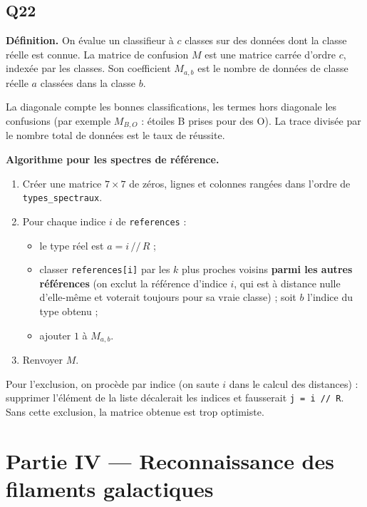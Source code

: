\documentclass[11pt,a4paper]{article}
\providecommand{\tightlist}{\setlength{\itemsep}{0pt}\setlength{\parskip}{0pt}}
\begin{document}
\hypertarget{q22}{%
\subsection{Q22}\label{q22}}

\textbf{Définition.} On évalue un classifieur à \(c\) classes sur des données dont la classe réelle est connue. La matrice de confusion \(M\) est une matrice carrée d'ordre \(c\), indexée par les classes. Son coefficient \(M_{a,b}\) est le nombre de données de classe réelle \(a\) classées dans la classe \(b\).

La diagonale compte les bonnes classifications, les termes hors diagonale les confusions (par exemple \(M_{B,O}\) : étoiles B prises pour des O). La trace divisée par le nombre total de données est le taux de réussite.

\textbf{Algorithme pour les spectres de référence.}

\begin{enumerate}
\def\labelenumi{\arabic{enumi}.}
\tightlist
\item
  Créer une matrice \(7 \times 7\) de zéros, lignes et colonnes rangées dans l'ordre de \texttt{types\_spectraux}.
\item
  Pour chaque indice \(i\) de \texttt{references} :

  \begin{itemize}
  \tightlist
  \item
    le type réel est \(a = i \,/\!/\, R\) ;
  \item
    classer \texttt{references{[}i{]}} par les \(k\) plus proches voisins \textbf{parmi les autres références} (on exclut la référence d'indice \(i\), qui est à distance nulle d'elle-même et voterait toujours pour sa vraie classe) ; soit \(b\) l'indice du type obtenu ;
  \item
    ajouter \(1\) à \(M_{a,b}\).
  \end{itemize}
\item
  Renvoyer \(M\).
\end{enumerate}

Pour l'exclusion, on procède par indice (on saute \(i\) dans le calcul des distances) : supprimer l'élément de la liste décalerait les indices et fausserait \texttt{j\ =\ i\ //\ R}. Sans cette exclusion, la matrice obtenue est trop optimiste.

\hypertarget{partie-iv-reconnaissance-des-filaments-galactiques}{%
\section{Partie IV --- Reconnaissance des filaments galactiques}\label{partie-iv-reconnaissance-des-filaments-galactiques}}
\end{document}
